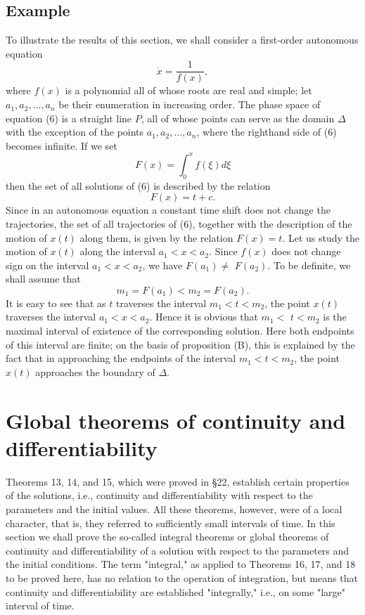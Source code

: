 \documentclass[10pt,a5paper]{book}
\theoremstyle{plain}
\theoremstyle{definition}
\theoremstyle{remark}
\begin{document}
\subsection*{Example}
To illustrate the results of this section, we shall consider a first-order autonomous equation
\begin{equation*}
\dot{x}=\frac{1}{f(x)}, \tag{6}
\end{equation*}
where $f(x)$ is a polynomial all of whose roots are real and simple; let $a_{1}, a_{2}, \ldots, a_{n}$ be their enumeration in increasing order. The phase space of equation (6) is a straight line $P$, all of whose points can serve as the domain $\Delta$ with the exception of the points $a_{1}, a_{2}, \ldots, a_{n}$, where the righthand side of (6) becomes infinite. If we set
\[
F(x)=\int_{0}^{x} f(\xi) d \xi
\]
then the set of all solutions of (6) is described by the relation
\[
F(x)=t+c .
\]
Since in an autonomous equation a constant time shift does not change the trajectories, the set of all trajectories of (6), together with the description of the motion of $x(t)$ along them, is given by the relation $F(x)=t$. Let us study the motion of $x(t)$ along the interval $a_{1}<x<a_{2}$. Since $f(x)$ does not change sign on the interval $a_{1}<x<a_{2}$, we have $F\left(a_{1}\right) \neq$
$F\left(a_{2}\right)$. To be definite, we shall assume that
\[
m_{1}=F\left(a_{1}\right)<m_{2}=F\left(a_{2}\right) .
\]
It is easy to see that as $t$ traverses the interval $m_{1}<t<m_{2}$, the point $x(t)$ traverses the interval $a_{1}<x<a_{2}$. Hence it is obvious that $m_{1}<$ $t<m_{2}$ is the maximal interval of existence of the corresponding solution. Here both endpoints of this interval are finite; on the basis of proposition (B), this is explained by the fact that in approaching the endpoints of the interval $m_{1}<t<m_{2}$, the point $x(t)$ approaches the boundary of $\Delta$.

\section{Global theorems of continuity and differentiability}
Theorems 13, 14, and 15, which were proved in §22, establish certain properties of the solutions, i.e., continuity and differentiability with respect to the parameters and the initial values. All these theorems, however, were of a local character, that is, they referred to sufficiently small intervals of time. In this section we shall prove the so-called integral theorems or global theorems of continuity and differentiability of a solution with respect to the parameters and the initial conditions. The term "integral," as applied to Theorems 16, 17, and 18 to be proved here, has no relation to the operation of integration, but means that continuity and differentiability are established "integrally," i.e., on some "large" interval of time.
\end{document}
